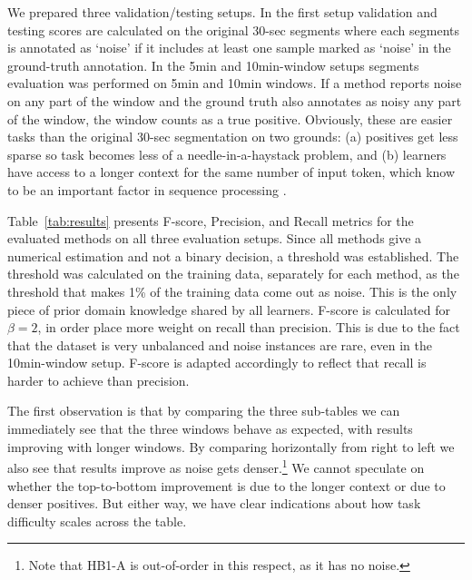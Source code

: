 \documentclass[runningheads]{llncs}
\begin{document}
We prepared three validation/testing setups. In the first setup
validation and testing scores are calculated on the original 30-sec
segments where each segments is annotated as `noise' if it includes at
least one sample marked as `noise' in the ground-truth annotation.
In the 5min and 10min-window setups segments evaluation was performed
on 5min and 10min windows. If a method reports noise on any part of
the window and the ground truth also annotates as noisy any part of the
window, the window counts as a true positive. Obviously, these are
easier tasks than the original 30-sec segmentation on two
grounds: (a) positives get less sparse so task becomes less of a
needle-in-a-haystack problem, and (b) learners have access to a longer
context for the same number of input token, which know to be an
important factor in sequence processing \cite{Lee_2021}.



Table~\ref{tab:results} presents F-score, Precision, and Recall
metrics for the evaluated methods on all three evaluation setups.
%
Since all methods give a numerical estimation and not a binary
decision, a threshold was established. The threshold was calculated
on the training data, separately for each method,
as the threshold that makes 1\% of the training data come out
as noise. This is the only piece of prior domain knowledge shared by
all learners.
%
F-score is calculated for $\beta=2$, in order place
more weight on recall than precision. This is due to the fact that
the dataset is very unbalanced and noise instances are rare, even in
the 10min-window setup. F-score is adapted accordingly to reflect
that recall is harder to achieve than precision.


The first observation is that by comparing the three sub-tables we can
immediately see that the three windows behave as expected, with
results improving with longer windows. By comparing horizontally from
right to left we also see that results improve as noise gets
denser.\footnote{Note that HB1-A is out-of-order in this respect, as
  it has no noise.}
We cannot speculate on whether the top-to-bottom improvement
is due to the longer context or due to denser positives. But either
way, we have clear indications about how task difficulty scales across
the table.
\end{document}
